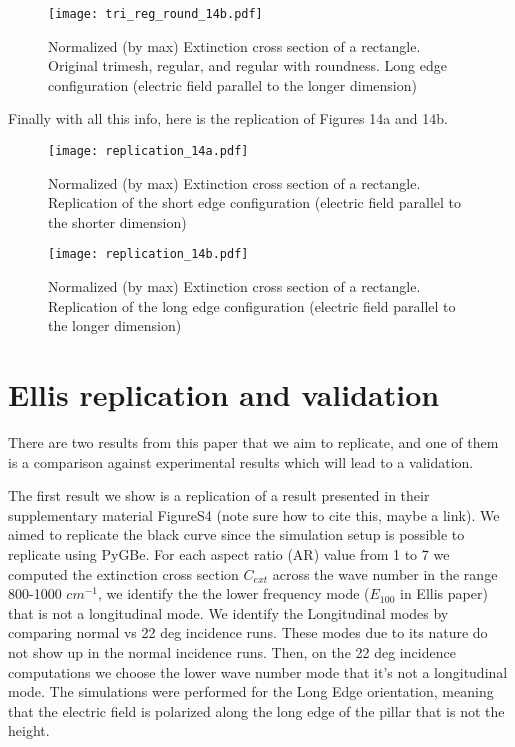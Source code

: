  \begin{figure}
    \centering
    \texttt{[image: tri\_reg\_round\_14b.pdf]} 
    \caption{Normalized (by max) Extinction cross section of a rectangle.  Original trimesh, regular, and regular with 
    roundness. Long edge configuration (electric field parallel to the longer dimension)}
    \label{fig:tri_reg_round_14b}
 \end{figure}


 Finally with all this info, here is the replication of Figures 14a and 14b. 

 \begin{figure}
    \centering
    \texttt{[image: replication\_14a.pdf]} 
    \caption{Normalized (by max) Extinction cross section of a rectangle. Replication of 
    the short edge configuration (electric field parallel to the shorter dimension)}
    \label{fig:rep_14a}
 \end{figure}

 \begin{figure}
    \centering
    \texttt{[image: replication\_14b.pdf]} 
    \caption{Normalized (by max) Extinction cross section of a rectangle. Replication of the 
    long edge configuration (electric field parallel to the longer dimension)}
    \label{fig:rep_14b}
 \end{figure}

 \section{Ellis replication and validation}

There are two results from this paper that we aim to replicate, and one of them is a comparison
against experimental results which will lead to a validation. 

The first result we show is a replication of a result presented in their supplementary 
material FigureS4 {\color{red}(note sure how to cite this, maybe a link)}. We aimed to replicate the 
black curve since the simulation setup is possible to replicate using PyGBe. For each aspect ratio (AR) 
value from 1 to 7 we computed the extinction cross section $C_{ext}$ across the wave number in the range
800-1000 $cm^{-1}$, we identify the the lower frequency mode ($E_{100}$ in Ellis paper)  that is not a 
longitudinal mode. We identify the Longitudinal modes by comparing normal vs 22 deg incidence runs. These
modes due to its nature do not show up in the normal incidence runs. Then, on the 22 deg incidence 
computations we choose the lower wave number mode that it's not a longitudinal mode. The simulations were 
performed for the Long Edge orientation, meaning that the electric field is polarized along the long edge 
of the pillar that is not the height. 

